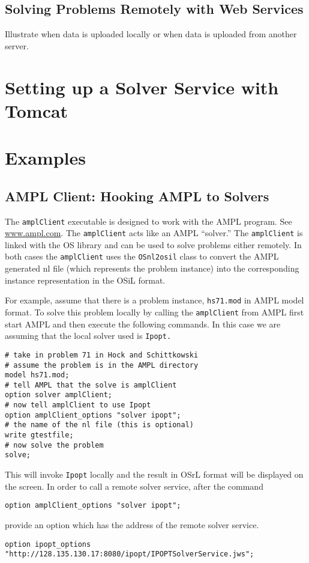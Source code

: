 \documentclass[12pt]{article}
\renewcommand{\_}{{\char"5F}}
\renewcommand{\{}{{\char"7B}}
\renewcommand{\}}{{\char"7D}}
\renewcommand{\^}{{\char"0D}}
\renewcommand{\'}{{\char"0D}}
\begin{document}
\subsection{Solving Problems Remotely with Web Services}

Illustrate when data is uploaded locally or when data is uploaded from another server. 

\section{Setting up a Solver Service with Tomcat}

\section{Examples}

\subsection{AMPL Client:  Hooking AMPL to Solvers}

The {\tt amplClient} executable is designed to work with the AMPL program. See \url{www.ampl.com}. The {\tt amplClient} acts like an AMPL ``solver.'' The {\tt amplClient} is linked with the OS library and can be used to solve problems either remotely. In both cases the {\tt amplClient} uses the {\tt OSnl2osil} class to convert the AMPL generated nl file (which represents the problem instance) into the corresponding instance representation in the OSiL format.  

For example, assume that there is a problem instance, {\tt hs71.mod} in AMPL model format. To solve this problem locally by calling the {\tt amplClient} from AMPL first start AMPL and then execute the following commands. In this case we are assuming that the local solver used is {\tt Ipopt.} 

\begin{verbatim}
# take in problem 71 in Hock and Schittkowski 
# assume the problem is in the AMPL directory
model hs71.mod;
# tell AMPL that the solve is amplClient
option solver amplClient;
# now tell amplClient to use Ipopt
option amplClient_options "solver ipopt";
# the name of the nl file (this is optional)
write gtestfile;
# now solve the problem
solve;
\end{verbatim}

This will invoke {\tt Ipopt} locally and the result in OSrL format will be displayed on the screen. In order to call a remote solver service, after the command
\begin{verbatim}
option amplClient_options "solver ipopt";
\end{verbatim}
provide an option which has the address of the remote solver service.
\begin{verbatim}
option ipopt_options "http://128.135.130.17:8080/ipopt/IPOPTSolverService.jws";
\end{verbatim}
\end{document}
